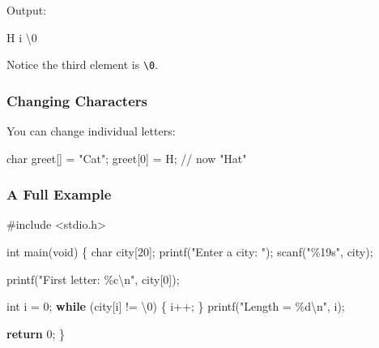 \documentclass[
  letterpaper,
  DIV=11,
  numbers=noendperiod]{scrreprt}
\newenvironment{Shaded}{\begin{snugshade}}{\end{snugshade}}
\newcommand{\CharTok}[1]{\textcolor[rgb]{0.13,0.47,0.30}{#1}}
\newcommand{\CommentTok}[1]{\textcolor[rgb]{0.37,0.37,0.37}{#1}}
\newcommand{\ControlFlowTok}[1]{\textcolor[rgb]{0.00,0.23,0.31}{\textbf{#1}}}
\newcommand{\DataTypeTok}[1]{\textcolor[rgb]{0.68,0.00,0.00}{#1}}
\newcommand{\DecValTok}[1]{\textcolor[rgb]{0.68,0.00,0.00}{#1}}
\newcommand{\ExtensionTok}[1]{\textcolor[rgb]{0.00,0.23,0.31}{#1}}
\newcommand{\ImportTok}[1]{\textcolor[rgb]{0.00,0.46,0.62}{#1}}
\newcommand{\NormalTok}[1]{\textcolor[rgb]{0.00,0.23,0.31}{#1}}
\newcommand{\OperatorTok}[1]{\textcolor[rgb]{0.37,0.37,0.37}{#1}}
\newcommand{\PreprocessorTok}[1]{\textcolor[rgb]{0.68,0.00,0.00}{#1}}
\newcommand{\SpecialCharTok}[1]{\textcolor[rgb]{0.37,0.37,0.37}{#1}}
\newcommand{\StringTok}[1]{\textcolor[rgb]{0.13,0.47,0.30}{#1}}
\begin{document}
Output:

\begin{Shaded}
\begin{Highlighting}[]
\ExtensionTok{H}\NormalTok{ i }\DataTypeTok{\textbackslash{}0}
\end{Highlighting}
\end{Shaded}

Notice the third element is
\texttt{\textquotesingle{}\textbackslash{}0\textquotesingle{}}.

\subsubsection{Changing Characters}\label{changing-characters}

You can change individual letters:

\begin{Shaded}
\begin{Highlighting}[]
\DataTypeTok{char}\NormalTok{ greet}\OperatorTok{[]} \OperatorTok{=} \StringTok{"Cat"}\OperatorTok{;}
\NormalTok{greet}\OperatorTok{[}\DecValTok{0}\OperatorTok{]} \OperatorTok{=} \CharTok{\textquotesingle{}H\textquotesingle{}}\OperatorTok{;}  \CommentTok{// now "Hat"}
\end{Highlighting}
\end{Shaded}

\subsubsection{A Full Example}\label{a-full-example-11}

\begin{Shaded}
\begin{Highlighting}[]
\PreprocessorTok{\#include }\ImportTok{\textless{}stdio.h\textgreater{}}

\DataTypeTok{int}\NormalTok{ main}\OperatorTok{(}\DataTypeTok{void}\OperatorTok{)} \OperatorTok{\{}
    \DataTypeTok{char}\NormalTok{ city}\OperatorTok{[}\DecValTok{20}\OperatorTok{];}
\NormalTok{    printf}\OperatorTok{(}\StringTok{"Enter a city: "}\OperatorTok{);}
\NormalTok{    scanf}\OperatorTok{(}\StringTok{"}\SpecialCharTok{\%19s}\StringTok{"}\OperatorTok{,}\NormalTok{ city}\OperatorTok{);}

\NormalTok{    printf}\OperatorTok{(}\StringTok{"First letter: }\SpecialCharTok{\%c\textbackslash{}n}\StringTok{"}\OperatorTok{,}\NormalTok{ city}\OperatorTok{[}\DecValTok{0}\OperatorTok{]);}

    \DataTypeTok{int}\NormalTok{ i }\OperatorTok{=} \DecValTok{0}\OperatorTok{;}
    \ControlFlowTok{while} \OperatorTok{(}\NormalTok{city}\OperatorTok{[}\NormalTok{i}\OperatorTok{]} \OperatorTok{!=} \CharTok{\textquotesingle{}}\SpecialCharTok{\textbackslash{}0}\CharTok{\textquotesingle{}}\OperatorTok{)} \OperatorTok{\{}
\NormalTok{        i}\OperatorTok{++;}
    \OperatorTok{\}}
\NormalTok{    printf}\OperatorTok{(}\StringTok{"Length = }\SpecialCharTok{\%d\textbackslash{}n}\StringTok{"}\OperatorTok{,}\NormalTok{ i}\OperatorTok{);}

    \ControlFlowTok{return} \DecValTok{0}\OperatorTok{;}
\OperatorTok{\}}
\end{Highlighting}
\end{Shaded}
\end{document}
